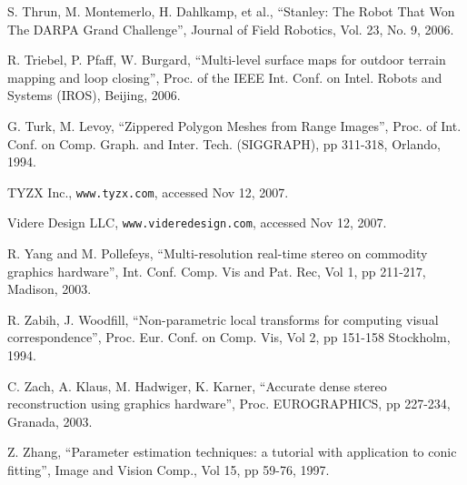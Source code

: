 \documentclass[twocolumn,oneside]{book}
\begin{document}
\begin{thebibliography}{99}
S. Thrun, M. Montemerlo, H. Dahlkamp, et al.,
``Stanley: The Robot That Won The DARPA Grand Challenge'',
Journal of Field Robotics, Vol. 23, No. 9, 2006.

R. Triebel, P. Pfaff, W. Burgard,
``Multi-level surface maps for outdoor terrain mapping and loop closing'',
Proc. of the IEEE Int. Conf. on Intel. Robots and Systems (IROS), Beijing, 2006.

G. Turk, M. Levoy,
``Zippered Polygon Meshes from Range Images'',
Proc.  of Int. Conf. on Comp. Graph. and Inter. Tech. (SIGGRAPH), pp 311-318, Orlando, 1994.

TYZX Inc.,
\verb+www.tyzx.com+, accessed Nov 12, 2007.

Videre Design LLC,
\verb+www.videredesign.com+, accessed Nov 12, 2007.

R. Yang and M. Pollefeys,
``Multi-resolution real-time stereo on commodity graphics hardware'',
Int. Conf. Comp. Vis and Pat. Rec, Vol 1, pp 211-217, Madison, 2003.

R. Zabih,  J. Woodfill,
``Non-parametric local transforms for computing visual correspondence'',
Proc. Eur. Conf. on Comp. Vis, Vol 2, pp 151-158 Stockholm, 1994.

C. Zach, A. Klaus, M. Hadwiger, K. Karner,
``Accurate dense stereo reconstruction using graphics hardware'',
Proc. EUROGRAPHICS, pp 227-234, Granada, 2003.

Z. Zhang,
``Parameter estimation techniques: a tutorial with application to conic fitting'',
Image and Vision Comp., Vol 15, pp 59-76, 1997.

\end{thebibliography}
\end{document}
